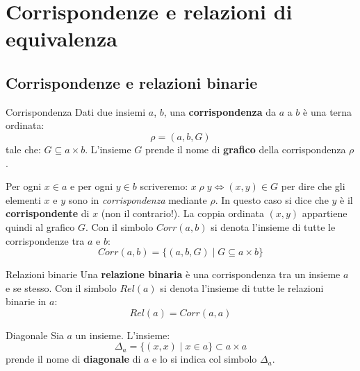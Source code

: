 \chapter{Corrispondenze e relazioni di equivalenza}

\section{Corrispondenze e relazioni binarie}

\begin{defbox}{Corrispondenza}
	Dati due insiemi $a$, $b$, una \textbf{corrispondenza} da $a$ a $b$ è una terna ordinata:
	\begin{equation}
		\rho = (a,b,G)
	\end{equation}
	tale che: $G \subseteq a \times b$. L'insieme $G$ prende il nome di \textbf{grafico} della corrispondenza $\rho$.
\end{defbox}

Per ogni $x \in a$ e per ogni $y \in b$ scriveremo: $x \; \rho \; y  \iff (x,y) \in G$ per dire che gli elementi $x$ e $y$ sono in \textit{corrispondenza} mediante $\rho$. In questo caso si dice che $y$ è il \textbf{corrispondente} di $x$ (non il contrario!). La coppia ordinata $(x,y)$ appartiene quindi al grafico $G$. Con il simbolo $Corr(a,b)$ si denota l'insieme di tutte le corrispondenze tra $a$ e $b$: 
\begin{equation}
	Corr(a,b) = \{(a,b,G) \; | \; G \subseteq a \times b \}
\end{equation}

\begin{defbox}{Relazioni binarie}\label{def:rel_binaria}
	Una \textbf{relazione binaria} è una corrispondenza tra un insieme $a$ e se stesso. Con il simbolo $Rel(a)$ si denota l'insieme di tutte le relazioni binarie in $a$:
	\begin{equation}
		Rel(a) = Corr(a,a)
	\end{equation}
\end{defbox}

\begin{defbox}{Diagonale}
	Sia $a$ un insieme. L'insieme:
	\begin{equation}
		\Delta_{a}=\{(x,x)\;|\;x \in a\}\subset a \times a
	\end{equation}
	prende il nome di \textbf{diagonale} di $a$ e lo si indica col simbolo $\Delta_{a}$.
\end{defbox}


